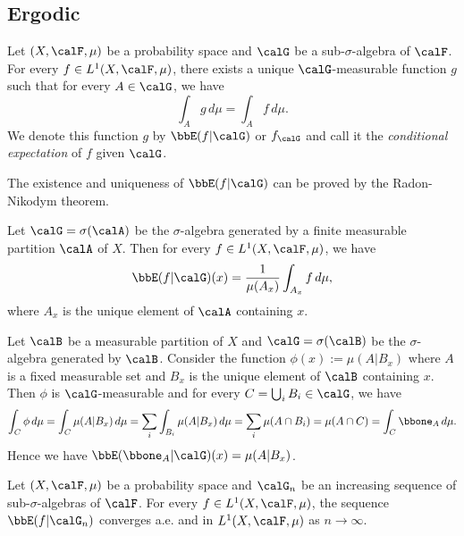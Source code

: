 \subsection{Ergodic}

  \begin{definition}
    Let $(X, \calF, \mu)$ be a probability space and $\calG$ be a sub-$\sigma$-algebra of $\calF$. 
    For every $f \in L^1(X, \calF, \mu)$, there exists a unique $\calG$-measurable function $g$ such that for every $A \in \calG$, we have
    \[ \int_A g \, d\mu = \int_A f \, d\mu. \]
    We denote this function $g$ by $\bbE(f | \calG)$ or $f_\calG$ and call it the \emph{conditional expectation} of $f$ given $\calG$.
  \end{definition}
  \begin{remark}
    The existence and uniqueness of $\bbE(f | \calG)$ can be proved by the Radon-Nikodym theorem.
  \end{remark}

  \begin{example}
    Let $\calG = \sigma(\calA)$ be the $\sigma$-algebra generated by a finite measurable partition $\calA$ of $X$. 
    Then for every $f \in L^1(X, \calF, \mu)$, we have
    \[ \bbE(f | \calG)(x) = \frac{1}{\mu(A_x)} \int_{A_x} f \, d\mu, \]
    where $A_x$ is the unique element of $\calA$ containing $x$.
  \end{example}

  \begin{example}
    Let $\calB$ be a measurable partition of $X$ and $\calG = \sigma(\calB)$ be the $\sigma$-algebra generated by $\calB$. 
    Consider the function $\phi(x) := \mu(A|B_x)$ where $A$ is a fixed measurable set and $B_x$ is the unique element of $\calB$ containing $x$. 
    Then $\phi$ is $\calG$-measurable and for every $C = \bigcup_i B_i \in \calG$, we have
    \[ \int_C \phi \, d\mu = \int_C \mu(A|B_x) \, d\mu = \sum_i \int_{B_i} \mu(A|B_x) \, d\mu = \sum_i \mu(A \cap B_i) = \mu(A \cap C) = \int_C \bbone_A \, d\mu. \]
    Hence we have $\bbE(\bbone_A | \calG)(x) = \mu(A|B_x)$.
  \end{example}


  \begin{theorem}
    Let $(X, \calF, \mu)$ be a probability space and $\calG_n$ be an increasing sequence of sub-$\sigma$-algebras of $\calF$. 
    For every $f \in L^1(X, \calF, \mu)$, the sequence $\bbE(f | \calG_n)$ converges a.e. and in $L^1(X, \calF, \mu)$ as $n \to \infty$.
  \end{theorem}

